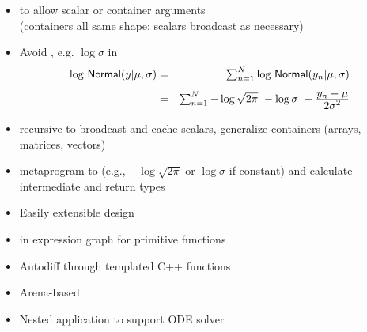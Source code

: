\documentclass[10pt]{report}
\begin{document}
%
\begin{itemize}
\item {} to allow scalar or container arguments
  \\ {\footnotesize (containers all same shape; scalars broadcast as necessary)}
\item Avoid , e.g. $\log \sigma$ in
  \hspace*{-18pt}
  {\small
    \begin{eqnarray*}
      \textstyle \log \, \mbox{\sf Normal}(y | \mu, \sigma)
      & = & \textstyle \sum_{n=1}^N \log \, \mbox{\sf Normal}(y_n | \mu,\sigma)
      \\[4pt]
      & = & \textstyle \sum_{n=1}^N  - \log \sqrt{2\pi} \ - \log \sigma \ -
      \frac{\textstyle y_n - \mu}{\textstyle 2\sigma^2}
    \end{eqnarray*}
  }
\item recursive  to broadcast and cache scalars,
  generalize containers (arrays, matrices, vectors)
\item {} metaprogram to  (e.g., $-\log
  \sqrt{2 \pi}$ or $\log \sigma$ if constant)
  and calculate intermediate and return types
\end{itemize}




%
\begin{itemize}
\item Easily extensible  design
\item {} in expression graph for primitive functions
\item Autodiff through templated C++ functions
\end{itemize}


%
\begin{itemize}
\item Arena-based 
\item Nested application to support ODE solver
\end{itemize}
\end{document}
